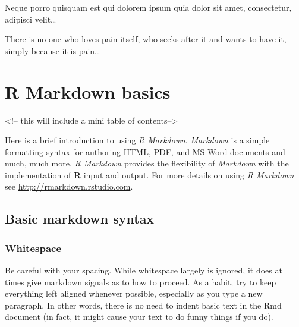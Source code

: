 \documentclass[a4paper,nobind]{templates/ociamthesis}
\begin{document}
\setlength{\textbaselineskip}{22pt plus2pt}

\setlength{\parskip}{2pt plus 1pt}

\setlength{\baselineskip}{\textbaselineskip}

\begin{savequote}
Neque porro quisquam est qui dolorem ipsum quia dolor sit amet,
consectetur, adipisci velit\ldots{}

There is no one who loves pain itself, who seeks after it and wants to
have it, simply because it is pain\ldots{}
\end{savequote}



\chapter{R Markdown basics}\label{rmd-basics}

\minitoc <!-- this will include a mini table of contents-->

\noindent Here is a brief introduction to using \emph{R Markdown}.
\emph{Markdown} is a simple formatting syntax for authoring HTML, PDF,
and MS Word documents and much, much more. \emph{R Markdown} provides
the flexibility of \emph{Markdown} with the implementation of \textbf{R}
input and output. For more details on using \emph{R Markdown} see
\url{http://rmarkdown.rstudio.com}.

\section{Basic markdown syntax}\label{basic-markdown-syntax}

\subsection{Whitespace}\label{whitespace}

Be careful with your spacing. While whitespace largely is ignored, it
does at times give markdown signals as to how to proceed. As a habit,
try to keep everything left aligned whenever possible, especially as you
type a new paragraph. In other words, there is no need to indent basic
text in the Rmd document (in fact, it might cause your text to do funny
things if you do).
\end{document}
